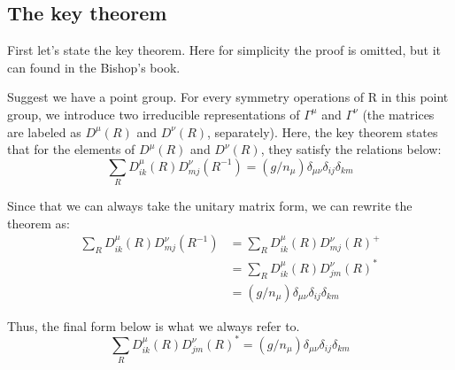 \subsection{The key theorem}
%
%
First let's state the key theorem. Here for simplicity the proof is
omitted, but it can found in the Bishop's book\cite{Bishop}.

Suggest we have a point group. For every symmetry operations of R in
this point group, we introduce two irreducible representations of
$\Gamma^{\mu}$ and $\Gamma^{\nu}$ (the matrices are labeled as
$D^{\mu}(R)$ and $D^{\nu}(R)$, separately). Here, the key theorem
states that for the elements of $D^{\mu}(R)$ and $D^{\nu}(R)$, they
satisfy the relations below:
\begin{equation}\label{GROUPeq:15}
  \sum_{R}D^{\mu}_{ik}(R) D^{\nu}_{mj}(R^{-1}) =
  (g/n_{\mu})\delta_{\mu\nu} \delta_{ij} \delta_{km}
\end{equation}

Since that we can always take the unitary matrix form, we can rewrite
the theorem as:
\begin{align}\label{}
  \sum_{R}D^{\mu}_{ik}(R) D^{\nu}_{mj}(R^{-1}) &=
  \sum_{R}D^{\mu}_{ik}(R) D^{\nu}_{mj}(R)^{+} \nonumber \\
  &= \sum_{R}D^{\mu}_{ik}(R) D^{\nu}_{jm}(R)^{*} \nonumber \\
  &= (g/n_{\mu})\delta_{\mu\nu} \delta_{ij} \delta_{km}
\end{align}

Thus, the final form below is what we always refer to.
\begin{equation}\label{GROUPeq:16}
  \sum_{R}D^{\mu}_{ik}(R) D^{\nu}_{jm}(R)^{*} =
  (g/n_{\mu})\delta_{\mu\nu} \delta_{ij} \delta_{km}
\end{equation}


